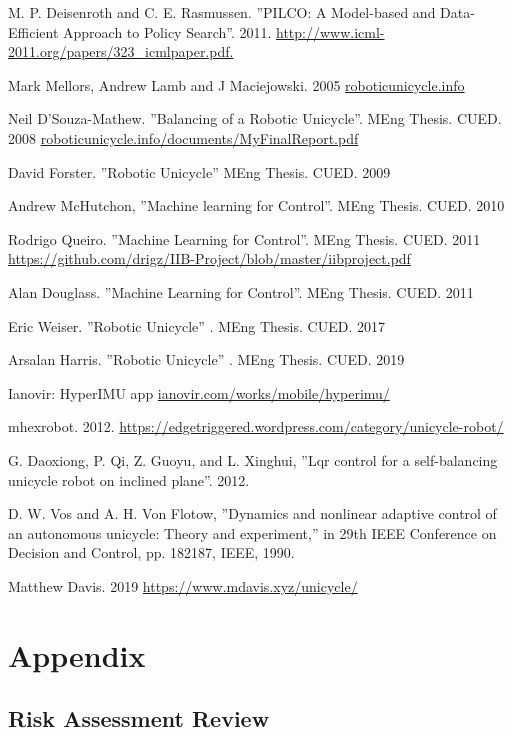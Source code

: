 \documentclass[twoside,twocolumn,12pt]{article}
\begin{document}

\clearpage
\begin{thebibliography}{9}
M. P. Deisenroth and C. E. Rasmussen. ''PILCO: A Model-based and Data-Efficient Approach to Policy Search''.
2011. \url{http://www.icml-2011.org/papers/323_icmlpaper.pdf.}

Mark Mellors, Andrew Lamb and J Maciejowski. 2005 \url{roboticunicycle.info} 

Neil D'Souza-Mathew. ''Balancing of a Robotic Unicycle''. MEng Thesis. CUED. 2008 \url{roboticunicycle.info/documents/MyFinalReport.pdf}

David Forster. ''Robotic Unicycle'' MEng Thesis. CUED. 2009

Andrew McHutchon, ''Machine learning for Control''. MEng Thesis. CUED. 2010

Rodrigo Queiro. ''Machine Learning for Control''. MEng Thesis. CUED. 2011
\url{https://github.com/drigz/IIB-Project/blob/master/iibproject.pdf}

Alan Douglass. ''Machine Learning for Control''. MEng Thesis. CUED. 2011

Eric Weiser. ''Robotic Unicycle'' . MEng Thesis. CUED. 2017

Arsalan Harris. ''Robotic Unicycle'' . MEng Thesis. CUED. 2019
 
 
Ianovir: HyperIMU app 
\url{ianovir.com/works/mobile/hyperimu/}

mhexrobot. 2012. \url{https://edgetriggered.wordpress.com/category/unicycle-robot/}

G. Daoxiong, P. Qi, Z. Guoyu, and L. Xinghui, ''Lqr control for a self-balancing unicycle
robot on inclined plane''. 2012.

D. W. Vos and A. H. Von Flotow, ''Dynamics and nonlinear adaptive control of an
autonomous unicycle: Theory and experiment,'' in 29th IEEE Conference on Decision
and Control, pp. 182{187, IEEE, 1990.}

Matthew Davis. 2019 \url{https://www.mdavis.xyz/unicycle/}




\end{thebibliography}



\clearpage
\section{Appendix}
\subsection{Risk Assessment Review}





\end{document}
